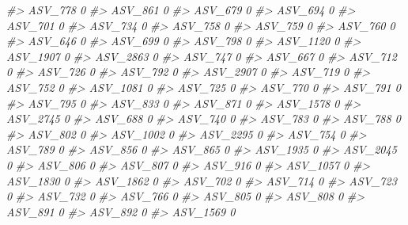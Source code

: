 \documentclass[
]{article}
\newenvironment{Shaded}{\begin{snugshade}}{\end{snugshade}}
\newcommand{\CommentTok}[1]{\textcolor[rgb]{0.56,0.35,0.01}{\textit{#1}}}
\begin{document}
\begin{Shaded}
\begin{Highlighting}[]
\CommentTok{\#\textgreater{} ASV\_778   0}
\CommentTok{\#\textgreater{} ASV\_861   0}
\CommentTok{\#\textgreater{} ASV\_679   0}
\CommentTok{\#\textgreater{} ASV\_694   0}
\CommentTok{\#\textgreater{} ASV\_701   0}
\CommentTok{\#\textgreater{} ASV\_734   0}
\CommentTok{\#\textgreater{} ASV\_758   0}
\CommentTok{\#\textgreater{} ASV\_759   0}
\CommentTok{\#\textgreater{} ASV\_760   0}
\CommentTok{\#\textgreater{} ASV\_646   0}
\CommentTok{\#\textgreater{} ASV\_699   0}
\CommentTok{\#\textgreater{} ASV\_798   0}
\CommentTok{\#\textgreater{} ASV\_1120  0}
\CommentTok{\#\textgreater{} ASV\_1907  0}
\CommentTok{\#\textgreater{} ASV\_2863  0}
\CommentTok{\#\textgreater{} ASV\_747   0}
\CommentTok{\#\textgreater{} ASV\_667   0}
\CommentTok{\#\textgreater{} ASV\_712   0}
\CommentTok{\#\textgreater{} ASV\_726   0}
\CommentTok{\#\textgreater{} ASV\_792   0}
\CommentTok{\#\textgreater{} ASV\_2907  0}
\CommentTok{\#\textgreater{} ASV\_719   0}
\CommentTok{\#\textgreater{} ASV\_752   0}
\CommentTok{\#\textgreater{} ASV\_1081  0}
\CommentTok{\#\textgreater{} ASV\_725   0}
\CommentTok{\#\textgreater{} ASV\_770   0}
\CommentTok{\#\textgreater{} ASV\_791   0}
\CommentTok{\#\textgreater{} ASV\_795   0}
\CommentTok{\#\textgreater{} ASV\_833   0}
\CommentTok{\#\textgreater{} ASV\_871   0}
\CommentTok{\#\textgreater{} ASV\_1578  0}
\CommentTok{\#\textgreater{} ASV\_2745  0}
\CommentTok{\#\textgreater{} ASV\_688   0}
\CommentTok{\#\textgreater{} ASV\_740   0}
\CommentTok{\#\textgreater{} ASV\_783   0}
\CommentTok{\#\textgreater{} ASV\_788   0}
\CommentTok{\#\textgreater{} ASV\_802   0}
\CommentTok{\#\textgreater{} ASV\_1002  0}
\CommentTok{\#\textgreater{} ASV\_2295  0}
\CommentTok{\#\textgreater{} ASV\_754   0}
\CommentTok{\#\textgreater{} ASV\_789   0}
\CommentTok{\#\textgreater{} ASV\_856   0}
\CommentTok{\#\textgreater{} ASV\_865   0}
\CommentTok{\#\textgreater{} ASV\_1935  0}
\CommentTok{\#\textgreater{} ASV\_2045  0}
\CommentTok{\#\textgreater{} ASV\_806   0}
\CommentTok{\#\textgreater{} ASV\_807   0}
\CommentTok{\#\textgreater{} ASV\_916   0}
\CommentTok{\#\textgreater{} ASV\_1057  0}
\CommentTok{\#\textgreater{} ASV\_1830  0}
\CommentTok{\#\textgreater{} ASV\_1862  0}
\CommentTok{\#\textgreater{} ASV\_702   0}
\CommentTok{\#\textgreater{} ASV\_714   0}
\CommentTok{\#\textgreater{} ASV\_723   0}
\CommentTok{\#\textgreater{} ASV\_732   0}
\CommentTok{\#\textgreater{} ASV\_766   0}
\CommentTok{\#\textgreater{} ASV\_805   0}
\CommentTok{\#\textgreater{} ASV\_808   0}
\CommentTok{\#\textgreater{} ASV\_891   0}
\CommentTok{\#\textgreater{} ASV\_892   0}
\CommentTok{\#\textgreater{} ASV\_1569  0}

\end{Highlighting}
\end{Shaded}
\end{document}
